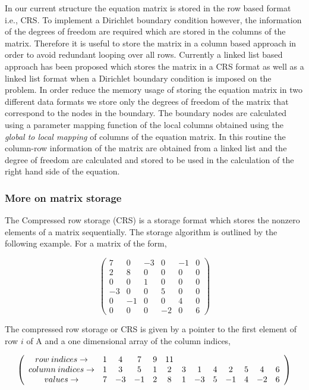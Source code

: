 In our current structure the equation matrix is stored in the row based format i.e., CRS. 
To implement a Dirichlet boundary condition however, the information of the degrees of freedom are required which are stored in the columns of the matrix. 
Therefore it is useful to store the matrix in a column based approach in order to avoid redundant looping over all rows.
Currently a linked list based approach has been proposed which stores the matrix in a CRS format as well as a linked list format 
when a Dirichlet boundary condition is imposed on the problem. In order reduce the memory usage of storing the equation matrix
 in two different data formats we store only the degrees of freedom of the matrix that correspond to the nodes in the boundary. 
The boundary nodes are calculated using a parameter mapping function of the local columns obtained using the 
\emph{global to local mapping} of columns of the equation matrix. In this routine the column-row information of the matrix are obtained 
from a linked list and the degree of freedom are calculated and stored to be used in the calculation of the right 
hand side of the equation.



\subsubsection{More on matrix storage}


The Compressed row storage (CRS) is a storage format which stores the nonzero elements of a matrix sequentially. 
The storage algorithm is outlined by the following example. For a matrix of the form,

\[ \left( \begin{array}{cccccc}
 7 & 0 &-3 & 0 &-1 & 0 \\
 2 & 8 & 0 & 0 & 0 & 0 \\
 0 & 0 & 1 & 0 & 0 & 0 \\
-3 & 0 & 0 & 5 & 0 & 0 \\
 0 &-1 & 0 & 0 & 4 & 0 \\
 0 & 0 & 0 &-2 & 0 & 6 \end{array} \right)\] 




The compressed row storage or CRS is given by a pointer to the first element of row $i$ of A and a one dimensional array of the column indices,

\[ \left( \begin{array}{cccccccccccccc}
 row \hspace{0.8mm} indices \rightarrow & 1 & 4 & 7 & 9 & 11&   &  &   &   &   &   &  \\
 column \hspace{0.8mm} indices \rightarrow & 1 & 3 & 5 & 1 & 2 & 3 & 1& 4 & 2 & 5 & 4 & 6 \\
 values \rightarrow & 7 &-3 &-1 & 2 & 8 & 1 & -3 & 5 & -1 & 4 & -2& 6 \end{array} \right)\]
 
